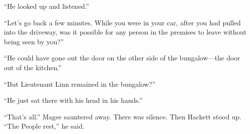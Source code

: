 \documentclass{novel}
\begin{document}
{“He looked up and listened.”

“Let’s go back a few minutes. While you were in your car, after you had pulled into the driveway, was it possible for any person in the premises to leave without being seen by you?”

“He could have gone out the door on the other side of the bungalow—the door out of the kitchen.”

“But Lieutenant Linn remained in the bungalow?”

“He just sat there with his head in his hands.”

“That’s all.” Magee sauntered away. There was silence. Then Hackett stood up. “The People rest,” he said.

}

\vspace{2\nbs}
\clearpage
\thispagestyle{empty}
\end{document}
